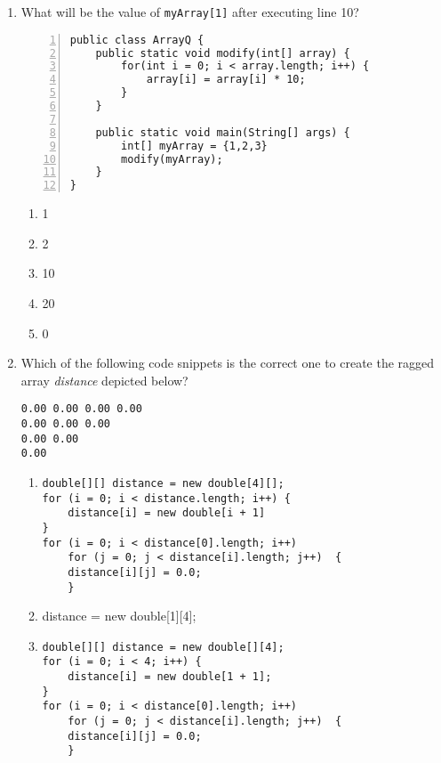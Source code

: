 \documentclass[CS180-S16-FinalExam.tex]{subfiles}
\begin{document}
\begin{enumerate}


\item What will be the value of \texttt{myArray[1]} after executing line 10?
\begin{lstlisting}[numbers=left]
public class ArrayQ {
	public static void modify(int[] array) {
    	for(int i = 0; i < array.length; i++) {
        	array[i] = array[i] * 10;
        }
    }
    
    public static void main(String[] args) {
    	int[] myArray = {1,2,3}
        modify(myArray);
    }
}
\end{lstlisting}

\begin{enumerate}
\item 1
\item 2
\item 10
\item 20 \ifdraft \Ans \fi
\item 0
\end{enumerate}
\clearpage
\item Which of the following code snippets is the correct one to create the ragged array \textit{distance} depicted below?
\begin{lstlisting}
0.00 0.00 0.00 0.00
0.00 0.00 0.00
0.00 0.00
0.00
\end{lstlisting}
\begin{enumerate}
\item \begin{lstlisting}
double[][] distance = new double[4][]; 
for (i = 0; i < distance.length; i++) { 
	distance[i] = new double[i + 1]           
} 
for (i = 0; i < distance[0].length; i++)
    for (j = 0; j < distance[i].length; j++)  {
    distance[i][j] = 0.0;
    }
\end{lstlisting}

\item distance = new double[1][4];

\item  \begin{lstlisting}
double[][] distance = new double[][4];
for (i = 0; i < 4; i++) {
	distance[i] = new double[1 + 1];
}
for (i = 0; i < distance[0].length; i++)
    for (j = 0; j < distance[i].length; j++)  {
    distance[i][j] = 0.0;
    }
\end{lstlisting}


\end{enumerate}
\end{enumerate}
\end{document}
